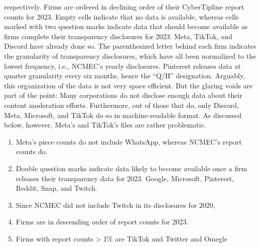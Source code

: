 \documentclass[nonacm,screen]{acmart}
\newcommand\hidden[1]{}
\begin{document}
\begin{itemize}
{respectively. Firms are ordered in declining order of their CyberTipline report
counts for 2023. Empty cells indicate that no data is available, whereas cells
marked with two question marks indicate data that should become available as
firms complete their transparency disclosures for 2023. Meta, TikTok, and
Discord have already done so. The parenthesized letter behind each firm
indicates the granularity of transparency disclosures, which have all been
normalized to the lowest frequency, i.e., NCMEC's yearly disclosures. Pinterest
releases data at quarter granularity every six months, hence the ``Q/H''
designation. Arguably, this organization of the data is not very space
efficient. But the glaring voids are part of the point: Many corporations do not
disclose enough data about their content moderation efforts. Furthermore, out of
those that do, only Discord, Meta, Microsoft, and TikTok do so in
machine-readable format. As discussed below, however, Meta's and TikTok's files
are rather problematic.



\begin{enumerate}
    \item Meta's piece counts do not include WhatsApp, whereas NCMEC's report counts do.
    \item Double question marks indicate data likely to become available once a firm
    releases their transparency data for 2023. Google, Microsoft, Pinterest, Reddit,
    Snap, and Twitch.
    \item Since NCMEC did not include Twitch in its disclosures for 2020,
    \item Firms are in descending order of report counts for 2023.
    \item Firms with report counts > 1\% are TikTok and Twitter and Omegle
    \end{enumerate}
}

\hidden{










The work described in this paper started with the question: Can an interested
individual, without institutional backing and without privileged access to
social media platforms, make an objective determination about the accuracy of
transparency disclosures on content moderation? While the question's
preconditions reflect the author's status as independent researcher, the
question has broader relevance, applying to people interested in performing open
source intelligence or strengthening civil society just as well. By exploring
the limits of individual agency, the question may have broader relevance still.
But the posture of underdog fighting corporate behemoths would also be
misleading, since the author worked as a software engineer for Facebook from
2018 to 2019. However, the author did \emph{not} work on content moderation and
does \emph{not} retain any financial interest in the firm.

}
\end{itemize}
\end{document}

